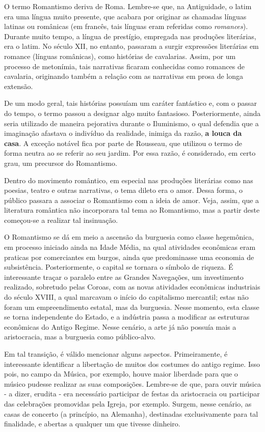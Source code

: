 \documentclass[12pt]{book}
\begin{document}
		\par O termo Romantismo deriva de Roma. Lembre-se que, na Antiguidade, o latim era uma língua muito presente, que acabara por originar as chamadas línguas latinas ou românicas (em francês, tais línguas eram referidas como \textit{romances}). Durante muito tempo, a língua de prestígio, empregada nas produções literárias, era o latim. No século XII, no entanto, passaram a surgir expressões literárias em romance (línguas românicas), como histórias de cavalarias. Assim, por um processo de metonímia, tais narrativas ficaram conhecidas como romances de cavalaria, originando também a relação com as narrativas em prosa de longa extensão.
		\par De um modo geral, tais histórias possuíam um caráter fantástico e, com o passar do tempo, o termo passou a designar algo muito fantasioso. Posteriormente, ainda seria utilizado de maneira pejorativa durante o Iluminismo, o qual defendia que a imaginação afastava o indivíduo da realidade, inimiga da razão, \textbf{a louca da casa}. A exceção notável fica por parte de Rousseau, que utilizou o termo de forma neutra ao se referir ao seu jardim. Por essa razão, é considerado, em certo grau, um precursor do Romantismo.
		\par Dentro do movimento romântico, em especial nas produções literárias como nas poesias, teatro e outras narrativas, o tema dileto era o amor. Dessa forma, o público passara a associar o Romantismo com a ideia de amor. Veja, assim, que a literatura romântica não incorporara tal tema ao Romantismo, mas a partir deste começou-se a realizar tal insinuação.
		\par O Romantismo se dá em meio a ascensão da burguesia como classe hegemônica, em processo iniciado ainda na Idade Média, na qual atividades econômicas eram praticas por comerciantes em burgos, ainda que predominasse uma economia de subsistência. Posteriormente, o capital se tornara o símbolo de riqueza. É interessante traçar o paralelo entre as Grandes Navegações, um investimento realizado, sobretudo pelas Coroas, com as novas atividades econômicas industriais do século XVIII, a qual marcavam o início do capitalismo mercantil; estas não foram um empreendimento estatal, mas da burguesia. Nesse momento, esta classe se torna independente do Estado, e a indústria passa a modificar as estruturas econômicas do Antigo Regime. Nesse cenário, a arte já não possuía mais a aristocracia, mas a burguesia como público-alvo.
		\par Em tal transição, é válido mencionar alguns aspectos. Primeiramente, é interessante identificar a libertação de muitos dos costumes do antigo regime. Isso pois, no campo da Música, por exemplo, houve maior liberdade para que o músico pudesse realizar as suas composições. Lembre-se de que, para ouvir música - a dizer, erudita - era necessário participar de festas da aristocracia ou participar das celebrações promovidas pela Igreja, por exemplo. Surgem, nesse cenário, as casas de concerto (a princípio, na Alemanha), destinadas exclusivamente para tal finalidade, e abertas a qualquer um que tivesse dinheiro.
\end{document}
